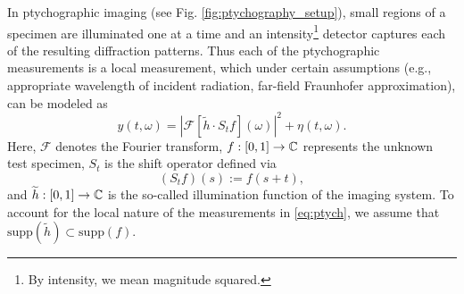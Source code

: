 In ptychographic imaging (see Fig.
\ref{fig:ptychography_setup}), small regions of a specimen are
illuminated one at a time and an intensity\footnote{By intensity,
we mean magnitude squared.} detector captures each of the
resulting  diffraction patterns. Thus each of the ptychographic
measurements is a local measurement, which under certain
assumptions (e.g., appropriate wavelength of incident radiation,
far-field Fraunhofer approximation), can be modeled as
\cite{Goodman2005IntroFourierOptics,Dierolf2008Ptych}%
%
\begin{equation}
    y(t, \omega) = \left \vert \mathcal F [ \widetilde h \cdot S_t f ] (\omega) 
       \right \vert^2 + \eta(t, \omega) .\label{eq:ptych}
\end{equation} 
%
%
Here, $\mathcal F$ denotes the Fourier transform, $f : [0, 1] \to \mathbb{C}$ represents
the unknown test specimen, $S_t$ is the shift operator defined
via $$(S_t f)(s) := f(s + t),$$ and $\widetilde h : [0, 1] \to \mathbb{C}$ is the so-called
illumination function %
\cite{arXiv:1105.5628_MarchesiniEtAl}
of the imaging system. %
To account for the local nature of the measurements in
\eqref{eq:ptych}, we assume that $\text{supp}(\widetilde h)
\subset \text{supp} (f)$.


